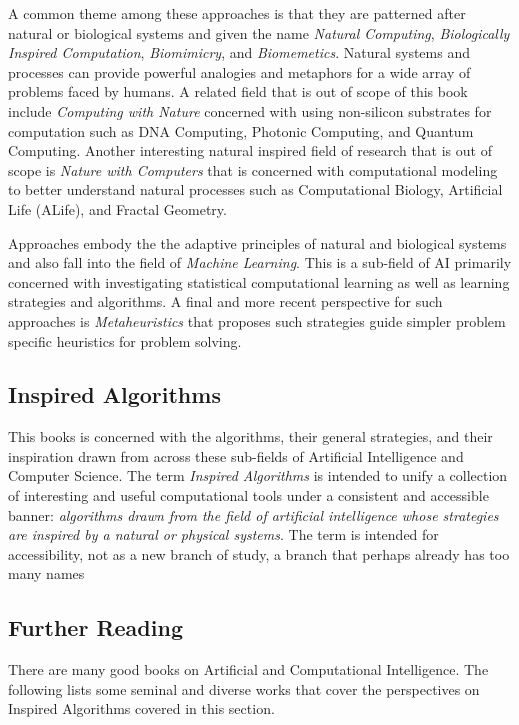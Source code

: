 A common theme among these approaches is that they are patterned after natural or biological systems and given the name \emph{Natural Computing}, \emph{Biologically Inspired Computation}, \emph{Biomimicry}, and \emph{Biomemetics}. Natural systems and processes can provide powerful analogies and metaphors for a wide array of problems faced by humans. A related field that is out of scope of this book include \emph{Computing with Nature} concerned with using non-silicon substrates for computation such as DNA Computing, Photonic Computing, and Quantum Computing. Another interesting natural inspired field of research that is out of scope is \textit{Nature with Computers} that is concerned with computational modeling to better understand natural processes such as Computational Biology, Artificial Life (ALife), and Fractal Geometry.

Approaches embody the the adaptive principles of natural and biological systems and also fall into the field of \emph{Machine Learning}. This is a sub-field of AI primarily concerned with investigating statistical computational learning as well as learning strategies and algorithms. A final and more recent perspective for such approaches is \emph{Metaheuristics} that proposes such strategies guide simpler problem specific heuristics for problem solving.

\subsection{Inspired Algorithms}
This books is concerned with the algorithms, their general strategies, and their inspiration drawn from across these sub-fields of Artificial Intelligence and Computer Science. The term \emph{Inspired Algorithms} is intended to unify a collection of interesting and useful computational tools under a consistent and accessible banner: \emph{algorithms drawn from the field of artificial intelligence whose strategies are inspired by a natural or physical systems}. The term is intended for accessibility, not as a new branch of study, a branch that perhaps already has too many names

\subsection{Further Reading}
There are many good books on Artificial and Computational Intelligence. The following lists some seminal and diverse works that cover the perspectives on Inspired Algorithms covered in this section.

